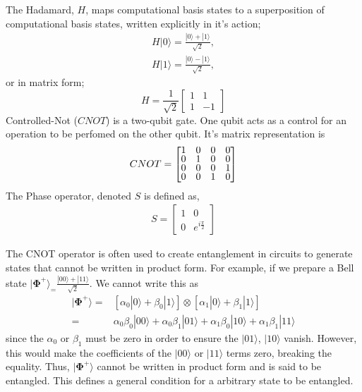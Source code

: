 The Hadamard, $H$, maps computational basis states to a superposition of computational basis states,
written explicitly in it's action;
\begin{align*}
    H |0\rangle = \frac{|0\rangle + |1\rangle}{\sqrt{2}}, \\
    H |1\rangle = \frac{|0\rangle - |1\rangle}{\sqrt{2}},
\end{align*}
or in matrix form;
\begin{equation*}
    H = \frac{1}{\sqrt{2}} \begin{bmatrix}
        1 & 1  \\
        1 & -1
    \end{bmatrix}
\end{equation*}
Controlled-Not ($CNOT$) is a two-qubit gate. One qubit acts as a control for an operation to be perfomed
on the other qubit. It's matrix representation is
\begin{align}
    \label{CNOT}
    CNOT =
    \renewcommand{\arraystretch}{0.75}
    \begin{bmatrix}
        1 & 0 & 0 & 0 \\
        0 & 1 & 0 & 0 \\
        0 & 0 & 0 & 1 \\
        0 & 0 & 1 & 0
    \end{bmatrix}
\end{align}
The Phase operator, denoted $S$ is defined as,
\begin{align*}
    S =
    \begin{bmatrix}
        1 & 0                  \\
        0 & e^{i\frac{\pi}{2}}
    \end{bmatrix}
\end{align*}

The CNOT operator is often used to create entanglement in circuits to
generate states that cannot be written in product form. For example, if we prepare a Bell state
$|{\bm\Phi}^{+}\rangle_ = \frac{|00\rangle + |11\rangle}{\sqrt{2}}$. We cannot write this as
\begin{align*}
    |{\bm\Phi}^+\rangle = & \left[ \alpha_0 |0\rangle + \beta_0|1\rangle\right] \otimes \left[\alpha_1 |0\rangle + \beta_1|1\rangle\right] \\
    =                     & \alpha_0\beta_0 |00\rangle + \alpha_0\beta_1|01\rangle + \alpha_1\beta_0|10\rangle + \alpha_1\beta_1|11\rangle
\end{align*}
since the $\alpha_0$ or $\beta_1$ must be zero in order to ensure the $|01\rangle$, $|10\rangle$ vanish.
However, this would make the coefficients of the $|00\rangle$
or $|11\rangle$ terms zero, breaking the equality. Thus, $|{\bm\Phi}^+\rangle$ cannot be written in
product form and is said to be entangled. This defines a general condition for a arbitrary state to be entangled. \cite{nielsen_chuang_2010}
